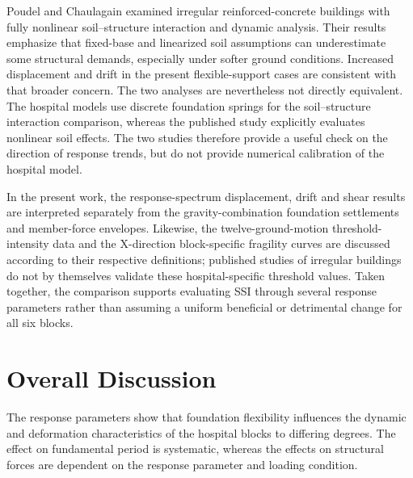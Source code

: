 Poudel and Chaulagain \cite{poudel2024} examined irregular reinforced-concrete buildings with fully nonlinear soil--structure interaction and dynamic analysis. Their results emphasize that fixed-base and linearized soil assumptions can underestimate some structural demands, especially under softer ground conditions. Increased displacement and drift in the present flexible-support cases are consistent with that broader concern. The two analyses are nevertheless not directly equivalent. The hospital models use discrete foundation springs for the soil--structure interaction comparison, whereas the published study explicitly evaluates nonlinear soil effects. The two studies therefore provide a useful check on the direction of response trends, but do not provide numerical calibration of the hospital model.

In the present work, the response-spectrum displacement, drift and shear results are interpreted separately from the gravity-combination foundation settlements and member-force envelopes. Likewise, the twelve-ground-motion threshold-intensity data and the X-direction block-specific fragility curves are discussed according to their respective definitions; published studies of irregular buildings do not by themselves validate these hospital-specific threshold values. Taken together, the comparison supports evaluating SSI through several response parameters rather than assuming a uniform beneficial or detrimental change for all six blocks.

\section{Overall Discussion}

The response parameters show that foundation flexibility influences the dynamic and deformation characteristics of the hospital blocks to differing degrees. The effect on fundamental period is systematic, whereas the effects on structural forces are dependent on the response parameter and loading condition.


